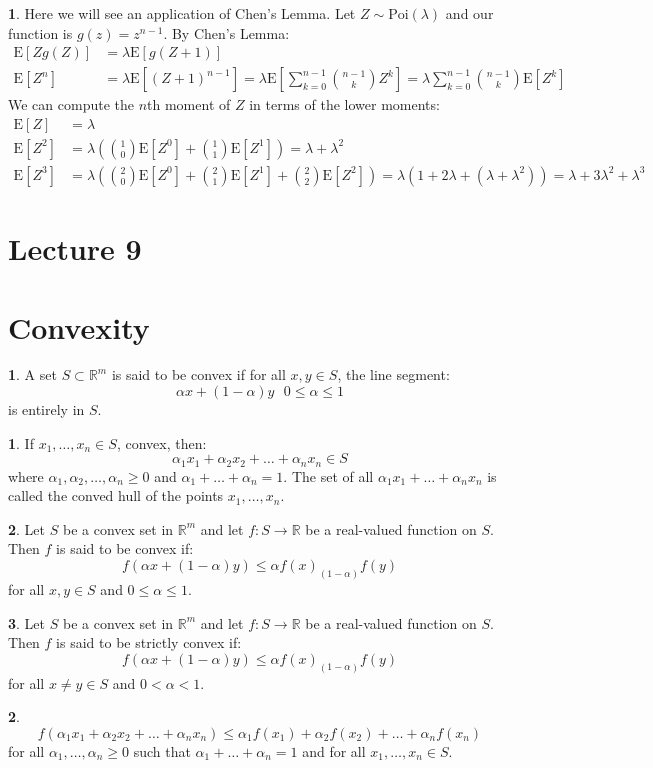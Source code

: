 \documentclass[english,12pt]{article}
\theoremstyle{plain}
\theoremstyle{definition}
\newtheorem*{definition}{\protect\definitionname}
\newtheorem*{example}{\protect\examplename}
\theoremstyle{definition} %
\newtheorem*{remark}{\protect\remarkname}
\newcommand{\defn}[1]{\begin{definition} #1 \end{definition} }
\newcommand{\eg}[1]{\begin{example} #1 \end{example} }
\newcommand{\rem}[1]{\begin{remark} #1 \end{remark} }
\providecommand{\definitionname}{Definition}
\providecommand{\remarkname}{Remark}
\providecommand{\examplename}{Example}
\newcommand{\brac}[1]{\left(#1\right)} %
\newcommand{\R}{\mathbb{R}} %
\newcommand{\ex}[1]{\mbox{E} \left[ #1 \right]}
\begin{document}
\eg{
Here we will see an application of Chen's Lemma.  Let $Z\sim\text{Poi}(\lambda)$ and our function is $g(z)=z^{n-1}$.  By Chen's Lemma:
\begin{align*}
\ex{Zg(Z)}&=\lambda\ex{g(Z+1)}\\
\ex{Z^n}&=\lambda\ex{(Z+1)^{n-1}}
=\lambda\ex{\sum\limits_{k=0}^{n-1}{n-1\choose k}Z^k}
=\lambda\sum\limits_{k=0}^{n-1}{n-1\choose k}\ex{Z^k}
\end{align*}
We can compute the $n$th moment of $Z$ in terms of the lower moments:
\begin{align*}
\ex{Z}&=\lambda\\
\ex{Z^2}&=\lambda\brac{{1\choose 0}\ex{Z^0}+{1\choose 1}\ex{Z^1}}
=\lambda+\lambda^2\\
\ex{Z^3}&=\lambda\brac{{2\choose 0}\ex{Z^0}+{2\choose 1}\ex{Z^1}+{2\choose 2}\ex{Z^2}}
=\lambda(1+2\lambda+(\lambda+\lambda^2))
=\lambda+3\lambda^2+\lambda^3
\end{align*}
}

\section*{Lecture 9}
\section{Convexity}
\defn{
A set $S\subset\R^m$ is said to be convex if for all $x,y\in S$, the line segment:
\[\alpha x+(1-\alpha)y\text{ }0\le\alpha\le 1\]
is entirely in $S$.
}

\rem{
If $x_1,\ldots,x_n\in S$, convex, then:
\[\alpha_1x_1+\alpha_2x_2+\ldots+\alpha_nx_n\in S\]
where $\alpha_1,\alpha_2,\ldots,\alpha_n\ge 0$ and $\alpha_1+\ldots+\alpha_n=1$.  The set of all $\alpha_1x_1+\ldots+\alpha_nx_n$ is called the conved hull of the points $x_1,\ldots,x_n$.
}

\defn{
Let $S$ be a convex set in $\R^m$ and let $f:S\to\R$ be a real-valued function on $S$.  Then $f$ is said to be convex if:
\[f(\alpha x+(1-\alpha)y)\le\alpha f(x)_(1-\alpha)f(y)\]
for all $x,y\in S$ and $0\le\alpha\le 1$.
}

\defn{
Let $S$ be a convex set in $\R^m$ and let $f:S\to\R$ be a real-valued function on $S$.  Then $f$ is said to be  strictly convex if:
\[f(\alpha x+(1-\alpha)y)\le\alpha f(x)_(1-\alpha)f(y)\]
for all $x\ne y\in S$ and $0<\alpha<1$.
}

\rem{
\[f(\alpha_1x_1+\alpha_2x_2+\ldots+\alpha_nx_n)\le\alpha_1f(x_1)+\alpha_2f(x_2)+\ldots+\alpha_nf(x_n)\]
for all $\alpha_1,\ldots,\alpha_n\ge 0$ such that $\alpha_1+\ldots+\alpha_n=1$ and for all $x_1,\ldots, x_n\in S$.
}
\end{document}
